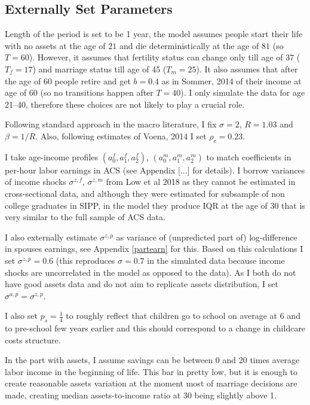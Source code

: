 \documentclass[12pt,letter]{article}
\begin{document}
\subsection{Externally Set Parameters}
Length of the period is set to be 1 year, the model assumes people start their life with no assets at the age of $21$ and die deterministically at the age of $81$ (so $T = 60$). However, it assumes that fertility status can change only till age of 37 ($T_f = 17$) and marriage status till age of 45 ($T_m = 25$). It also assumes that after the age of 60 people retire and get $b = 0.4$ as in Sommer, 2014 of their income at age of 60 (so no transitions happen after $T = 40$). I only simulate the data for age 21--40, therefore these choices are not likely to play a crucial role. 

Following standard approach in the macro literature, I fix $\sigma = 2$, $R = 1.03$ and $\beta = 1/R$. Also, following estimates of Voena, 2014 I set $\rho_c = 0.23$.

I take age-income profiles  $(a^f_0,a^f_1,a^f_2)$, $(a^m_0,a^m_1,a^m_2)$ to match coefficients in per-hour labor earnings in ACS (see Appendix [...] for details). I borrow variances of income shocks $\sigma^{z,f}$, $\sigma^{z,m}$ from Low et al 2018 as they cannot be estimated in cross-sectional data, and although they were estimated for subsample of non college graduates in SIPP, in the model they produce IQR at the age of 30 that is very similar to the full sample of ACS data.

I also externally estimate $\sigma^{z,p}$ as variance of (unpredicted part of) log-difference in spouses earnings, see Appendix \ref{partearn} for this. Based on this calculations I set $\sigma^{z,p} = 0.6$ (this reproduces $\sigma = 0.7$ in the simulated data because income shocks are uncorrelated in the model as opposed to the data). As I both do not have good assets data and do not aim to replicate assets distribution, I set $\sigma^{a,p} = \sigma^{z,p}$.

I also set $p_s = \frac14$ to roughly reflect that children go to school on average at 6 and to pre-school few years earlier and this should correspond to a change in childcare costs structure.

In the part with assets, I assume savings can be between 0 and 20 times average labor income in the beginning of life. This bar in pretty low, but it is enough to create reasonable assets variation at the moment most of marriage decisions are made, creating median assets-to-income ratio at 30 being slightly above 1.
\end{document}
